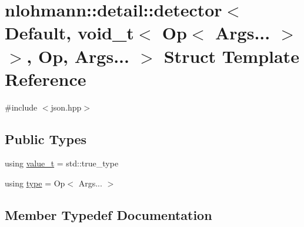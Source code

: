 \hypertarget{structnlohmann_1_1detail_1_1detector_3_01_default_00_01void__t_3_01_op_3_01_args_8_8_8_01_4_01_4_00_01_op_00_01_args_8_8_8_01_4}{}\section{nlohmann\+::detail\+::detector$<$ Default, void\+\_\+t$<$ Op$<$ Args... $>$ $>$, Op, Args... $>$ Struct Template Reference}
\label{structnlohmann_1_1detail_1_1detector_3_01_default_00_01void__t_3_01_op_3_01_args_8_8_8_01_4_01_4_00_01_op_00_01_args_8_8_8_01_4}


{\ttfamily \#include $<$json.\+hpp$>$}

\subsection*{Public Types}
\begin{DoxyCompactItemize}
\item 
using \mbox{\hyperlink{structnlohmann_1_1detail_1_1detector_3_01_default_00_01void__t_3_01_op_3_01_args_8_8_8_01_4_01_4_00_01_op_00_01_args_8_8_8_01_4_ab748f9f00bb31bee4978a033589f8c85}{value\+\_\+t}} = std\+::true\+\_\+type
\item 
using \mbox{\hyperlink{structnlohmann_1_1detail_1_1detector_3_01_default_00_01void__t_3_01_op_3_01_args_8_8_8_01_4_01_4_00_01_op_00_01_args_8_8_8_01_4_a5afd6a40e94dde21d120ac646468c495}{type}} = Op$<$ Args... $>$
\end{DoxyCompactItemize}


\subsection{Member Typedef Documentation}
\mbox{\label{structnlohmann_1_1detail_1_1detector_3_01_default_00_01void__t_3_01_op_3_01_args_8_8_8_01_4_01_4_00_01_op_00_01_args_8_8_8_01_4_a5afd6a40e94dde21d120ac646468c495}} 
